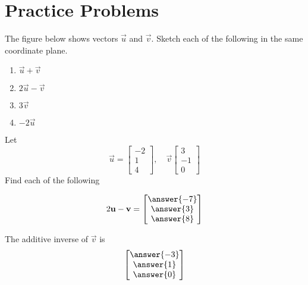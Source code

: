 \documentclass{ximera}
\begin{document}
\section*{Practice Problems}
 
 \begin{problem}\label{prob:sketchsumdiff}
The figure below shows vectors $\vec{u}$ and $\vec{v}$.  Sketch each of the following in the same coordinate plane.
 
\begin{image}[2.5in]
\end{image}
 \begin{enumerate}
  \item 
  $\vec{u}+\vec{v}$
  \item
  $2\vec{u}-\vec{v}$
  \item 
  $3\vec{v}$
  \item
  $-2\vec{u}$
  \end{enumerate}
\end{problem}

\begin{problem}\label{prob:evaluatevectsumdiff} Let $$\vec{u}=\begin{bmatrix}-2\\1\\4\end{bmatrix},\quad\vec{v}\begin{bmatrix}3\\-1\\0\end{bmatrix}$$
Find each of the following
\begin{problem}\label{prob:evaluatevectsumdiff1}
$$2\vec{u}-\vec{v}=\begin{bmatrix}\answer{-7}\\\answer{3}\\\answer{8}\end{bmatrix}$$
\end{problem}
\begin{problem} \label{prob:evaluatevectsumdiff2}The additive inverse of $\vec{v}$ is
$$\begin{bmatrix}\answer{-3}\\\answer{1}\\\answer{0}\end{bmatrix}$$
\end{problem}
\end{problem}
\end{document}
